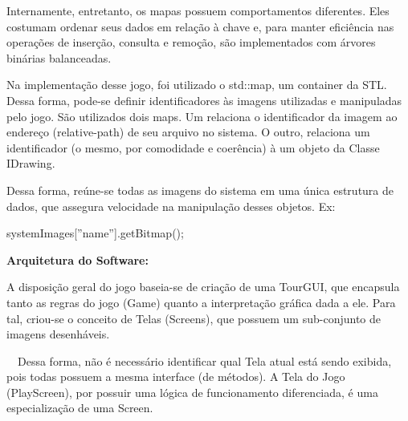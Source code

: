 \documentclass[a4paper]{article}
\begin{document}
{\color{black}
Internamente, entretanto, os mapas possuem comportamentos diferentes.
Eles costumam ordenar seus dados em relação à chave e, para manter
eficiência nas operações de inserção, consulta e remoção, são
implementados com árvores binárias balanceadas.}

{\color{black}
Na implementação desse jogo, foi utilizado o std::map, um container da
STL. Dessa forma, pode-se definir identificadores às imagens utilizadas
e manipuladas pelo jogo. São utilizados dois maps. Um relaciona o
identificador da imagem ao endereço (relative-path) de seu arquivo no
sistema. O outro, relaciona um identificador (o mesmo, por comodidade e
coerência) à um objeto da Classe IDrawing.}

{\color{black}
Dessa forma, reúne-se todas as imagens do sistema em uma única estrutura
de dados, que assegura velocidade na manipulação desses objetos. Ex:}

{\color{black}
\textcolor[rgb]{0.8392157,0.6156863,0.52156866}{systemImages[}\textcolor[rgb]{0.3372549,0.6117647,0.8392157}{”name”}\textcolor[rgb]{0.8392157,0.6156863,0.52156866}{].}\textcolor[rgb]{0.3254902,0.5058824,0.20784314}{getBitmap}\textcolor[rgb]{0.8392157,0.6156863,0.52156866}{();}}


\bigskip


\bigskip


\bigskip

{\color{black}
\textbf{Arquitetura do Software: }}

{\color{black}
A disposição geral do jogo baseia-se de criação de uma TourGUI, que
encapsula tanto as regras do jogo (Game) quanto a interpretação gráfica
dada a ele. Para tal, criou-se o conceito de Telas (Screens), que
possuem um sub-conjunto de imagens desenháveis.}

{\color{black}
\ \ Dessa forma, não é necessário identificar qual Tela atual está sendo
exibida, pois todas possuem a mesma interface (de métodos). A Tela do
Jogo (PlayScreen), por possuir uma lógica de funcionamento
diferenciada, é uma especialização de uma Screen.}
\end{document}
